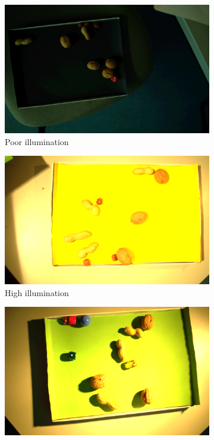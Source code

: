 \documentclass[journal,onecolumn,12pt]{IEEEtran}
\begin{document}
\begin{figure}
	\centering
	\begin{subfigure}[b]{0.3\textwidth}
		\centering
		\includegraphics[width=\textwidth]{images/challenges/Low_illu_371.png}
		\caption{Poor illumination}
	\end{subfigure}
	\hfill
	\begin{subfigure}[b]{0.3\textwidth}  
		\centering 
		\includegraphics[width=\textwidth]{images/challenges/High_illu_336.png}
		\caption{High illumination} 
	\end{subfigure}
	\hfill
	\begin{subfigure}[b]{0.3\textwidth}  
		\centering 
		\includegraphics[width=\textwidth]{images/challenges/object_shadow_344.png}

\end{subfigure}
\end{figure}
\end{document}
